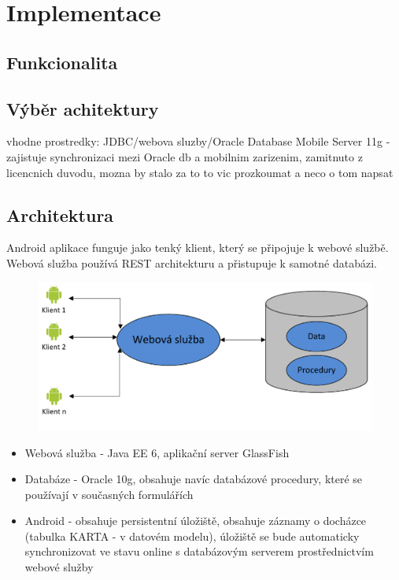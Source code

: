 \documentclass{bakalarka}
\begin{document}
\chapter{Implementace}

\section{Funkcionalita}

\section{Výběr achitektury}
vhodne prostredky: JDBC/webova sluzby/Oracle Database Mobile Server 11g - zajistuje synchronizaci mezi Oracle db a mobilnim zarizenim, zamitnuto z licencnich duvodu, mozna by stalo za to to vic prozkoumat a neco o tom napsat
\section{Architektura}
Android aplikace funguje jako tenký klient, který se připojuje k webové službě. Webová služba používá REST architekturu a přistupuje k samotné databázi.

\begin{figure}[H]
  \centering
  \includegraphics[scale=0.8]{obr/souc_arch2.pdf}
  \label{obr: logo zcu}
\end{figure}

\begin{itemize}
\item Webová služba - Java EE 6, aplikační server GlassFish
\item Databáze - Oracle 10g, obsahuje navíc databázové procedury, které se používají v současných formulářích  
\item Android - obsahuje persistentní úložiště, obsahuje záznamy o docházce (tabulka KARTA - v datovém modelu), úložiště se bude automaticky synchronizovat ve stavu online s databázovým serverem prostřednictvím webové služby
\end{itemize}
\end{document}
